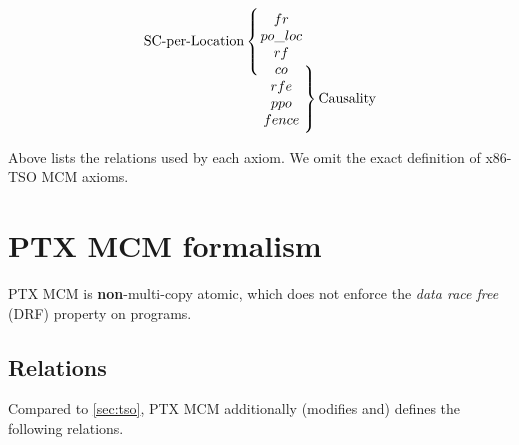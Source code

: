 \documentclass[11pt,a4paper]{article}
\begin{document}
$$
\begin{align*}
\raisebox{2.05em}{$\text{SC-per-Location} \left\{\rule{0em}{2.7em}\right.$}
    \begin{matrix}
        fr\\ 
        po\_loc\\
        rf\\
        co\\
        rfe\\
        ppo\\
        fence\\
    \end{matrix}
\raisebox{-2.05em}{$\left.\rule{0em}{2.7em}\right\} \text{Causality}$}
\end{align*}
$$

Above lists the relations used by each axiom. We omit the exact definition of x86-TSO MCM axioms.

\section{PTX MCM formalism}

PTX MCM is \textbf{non}-multi-copy atomic, which does not enforce the \textit{data race free} (DRF) property on programs.

\subsection{Relations}

Compared to \ref{sec:tso}, PTX MCM additionally (modifies and) defines the following relations.
\end{document}
